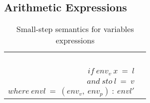 \subsection{Arithmetic Expressions}

\begin{table}[H]
    \centering
    \begin{longtable}[c] { r c }
    \begin{tabular}{@{}c@{}} 
    [VAR] \\
    \newline \\
    \newline \\
    \newline \\
    \end{tabular}
  \begin{tabular}{@{}c@{}}   \( \langle a, \ envl, \ sto \rangle \Rightarrow \langle v, \ envl, \ sto \rangle  \)
  \\ \( if \ env_v \ x \ = \ l \)
  \\ \( and \ sto \ l \ = \ v \)
  \\ \( where \ envl \ = \ (env_v, \ env_p) \ : \ envl' \)
  \end{tabular}
        
 \end{longtable}
    \caption{Small-step semantics for variables expressions}\label{sem:bool-ass}
\end{table}

